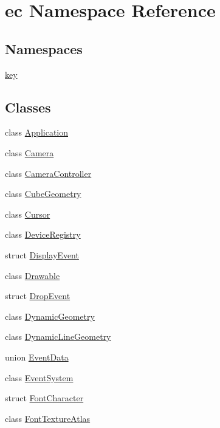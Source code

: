 \hypertarget{namespaceec}{}\section{ec Namespace Reference}
\label{namespaceec}
\subsection*{Namespaces}
\begin{DoxyCompactItemize}
\item 
 \mbox{\hyperlink{namespaceec_1_1key}{key}}
\end{DoxyCompactItemize}
\subsection*{Classes}
\begin{DoxyCompactItemize}
\item 
class \mbox{\hyperlink{classec_1_1_application}{Application}}
\item 
class \mbox{\hyperlink{classec_1_1_camera}{Camera}}
\item 
class \mbox{\hyperlink{classec_1_1_camera_controller}{Camera\+Controller}}
\item 
class \mbox{\hyperlink{classec_1_1_cube_geometry}{Cube\+Geometry}}
\item 
class \mbox{\hyperlink{classec_1_1_cursor}{Cursor}}
\item 
class \mbox{\hyperlink{classec_1_1_device_registry}{Device\+Registry}}
\item 
struct \mbox{\hyperlink{structec_1_1_display_event}{Display\+Event}}
\item 
class \mbox{\hyperlink{classec_1_1_drawable}{Drawable}}
\item 
struct \mbox{\hyperlink{structec_1_1_drop_event}{Drop\+Event}}
\item 
class \mbox{\hyperlink{classec_1_1_dynamic_geometry}{Dynamic\+Geometry}}
\item 
class \mbox{\hyperlink{classec_1_1_dynamic_line_geometry}{Dynamic\+Line\+Geometry}}
\item 
union \mbox{\hyperlink{unionec_1_1_event_data}{Event\+Data}}
\item 
class \mbox{\hyperlink{classec_1_1_event_system}{Event\+System}}
\item 
struct \mbox{\hyperlink{structec_1_1_font_character}{Font\+Character}}
\item 
class \mbox{\hyperlink{classec_1_1_font_texture_atlas}{Font\+Texture\+Atlas}}

\end{DoxyCompactItemize}

